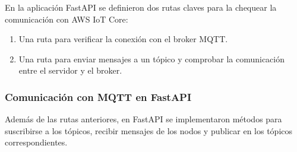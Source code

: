 
En la aplicación FastAPI se definieron dos rutas claves para la chequear la
comunicación con AWS IoT Core:

\begin{enumerate}
    \item Una ruta para verificar la conexión con el broker MQTT.
    \item Una ruta para enviar mensajes a un tópico y comprobar la comunicación entre el
          servidor y el broker.
\end{enumerate}





\subsubsection{Comunicación con MQTT en FastAPI}

Además de las rutas anteriores, en FastAPI se implementaron métodos para
suscribirse a los tópicos, recibir mensajes de los nodos y publicar en los
tópicos correspondientes.

